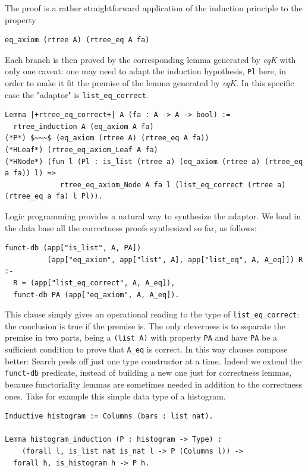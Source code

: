 \documentclass[a4paper,UKenglish,cleveref, autoref]{lipics-v2019}
\newcommand{\derive}[1]{\emph{#1}}
\begin{document}
\noindent
The proof is a rather straightforward application
of the induction principle to the property

\begin{lstlisting}
eq_axiom (rtree A) (rtree_eq A fa)
\end{lstlisting}

\noindent
Each branch is then proved by the corresponding
lemma generated by \derive{eqK} with only one caveat:
one may need to adapt the induction hypothesis, 
\lstinline+Pl+ here, in order to make it fit the premise
of the lemma generated by \derive{eqK}. In this specific
case the "adaptor" is \lstinline+list_eq_correct+.

\begin{lstlisting}
Lemma |+rtree_eq_correct+| A (fa : A -> A -> bool) :=
  rtree_induction A (eq_axiom A fa)
(*P*) $~~~$ (eq_axiom (rtree A) (rtree_eq A fa))
(*HLeaf*) (rtree_eq_axiom_Leaf A fa)
(*HNode*) (fun l (Pl : is_list (rtree a) (eq_axiom (rtree a) (rtree_eq a fa)) l) =>
             rtree_eq_axiom_Node A fa l (list_eq_correct (rtree a) (rtree_eq a fa) l Pl)).
\end{lstlisting}

Logic programming provides a natural way to synthesize
the adaptor.  We load in the data base
all the correctness proofs synthesized so far, as follows:

\begin{lstlisting}[]
funct-db (app["is_list", A, PA])
          (app["eq_axiom", app["list", A], app["list_eq", A, A_eq]]) R :-
  R = (app["list_eq_correct", A, A_eq]),
  funct-db PA (app["eq_axiom", A, A_eq]).
\end{lstlisting}

\noindent
This clause simply gives an operational reading to the type
of \lstinline+list_eq_correct+: the conclusion is true if the premise
is. The only cleverness is to separate the premise in two parts,
being a \lstinline+(list A)+ with property \lstinline+PA+ and have
\lstinline+PA+ be a sufficient condition to prove that \lstinline+A_eq+
is correct. In this way clauses compose better:
Search peels off just one type constructor at a time.
Indeed we extend the \lstinline+funct-db+ predicate, instead of building
a new one just for correctness lemmas, because functoriality lemmas
are sometimes needed in addition to the correctness ones.
Take for example this simple data type of a histogram.

\begin{lstlisting}
Inductive histogram := Columns (bars : list nat).

Lemma histogram_induction (P : histogram -> Type) :
    (forall l, is_list nat is_nat l -> P (Columns l)) ->
  forall h, is_histogram h -> P h.
\end{lstlisting}
\end{document}
